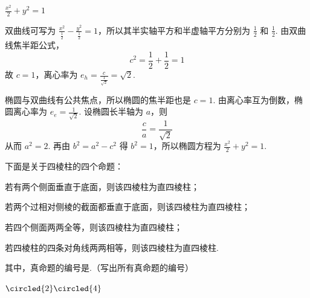 \begin{answer}
\(\frac{x^{2}}{2} + y^{2} = 1\)
\end{answer}

\begin{solution}
双曲线可写为
\(\frac{x^2}{\frac{1}{2}}-\frac{y^2}{\frac{1}{2}}=1\)，所以其半实轴平方和半虚轴平方分别为 \(\frac12\) 和 \(\frac12\). 由双曲线焦半距公式，
\[
c^2=\frac12+\frac12=1
\]
故 \(c=1\)，离心率为 \(e_h=\frac{c}{\frac{1}{\sqrt2}}=\sqrt2\).

椭圆与双曲线有公共焦点，所以椭圆的焦半距也是 \(c=1\). 由离心率互为倒数，椭圆离心率为 \(e_e=\frac{1}{\sqrt2}\). 设椭圆长半轴为 \(a\)，则
\[
\frac ca=\frac1{\sqrt2}
\]
从而 \(a^2=2\). 再由 \(b^2=a^2-c^2\) 得 \(b^2=1\)，所以椭圆方程为 \(\frac{x^2}{2}+y^2=1\).
\end{solution}

\begin{problem}
下面是关于四棱柱的四个命题：

\begin{circlelist}
\item 若有两个侧面垂直于底面，则该四棱柱为直四棱柱；
\item 若两个过相对侧棱的截面都垂直于底面，则该四棱柱为直四棱柱；
\item 若四个侧面两两全等，则该四棱柱为直四棱柱；
\item 若四棱柱的四条对角线两两相等，则该四棱柱为直四棱柱.
\end{circlelist}

其中，真命题的编号是\fillinblank{}.（写出所有真命题的编号）
\end{problem}

\begin{answer}
\(\circled{2}\circled{4}\)
\end{answer}

